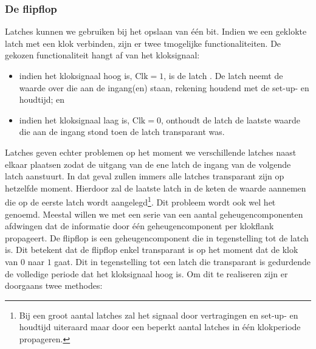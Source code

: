 \subsubsection{De flipflop}
Latches kunnen we gebruiken bij het opslaan van \'e\'en bit. Indien we een geklokte latch met een klok verbinden, zijn er twee tmogelijke functionaliteiten. De gekozen functionaliteit hangt af van het kloksignaal:

\begin{itemize}
 \item indien het kloksignaal hoog is, $\mbox{Clk}=1$, is de latch . De latch neemt de waarde over die aan de ingang(en) staan, rekening houdend met de set-up- en houdtijd; en
 \item indien het kloksignaal laag is, $\mbox{Clk}=0$, onthoudt de latch de laatste waarde die aan de ingang stond toen de latch transparant was.
\end{itemize}

Latches geven echter problemen op het moment we verschillende latches naast elkaar plaatsen zodat de uitgang van de ene latch de ingang van de volgende latch aanstuurt. In dat geval zullen immers alle latches transparant zijn op hetzelfde moment. Hierdoor zal de laatste latch in de keten de waarde aannemen die op de eerste latch wordt aangelegd\footnote{Bij een groot aantal latches zal het signaal door vertragingen en set-up- en houdtijd uiteraard maar door een beperkt aantal latches in \'e\'en klokperiode propageren.}. Dit probleem wordt ook wel het  genoemd. Meestal willen we met een serie van een aantal geheugencomponenten afdwingen dat de informatie door \'e\'en geheugencomponent per klokflank propageert. De flipflop is een geheugencomponent die in tegenstelling tot de latch  is. Dit betekent dat de flipflop enkel transparant is op het moment dat de klok van $0$ naar $1$ gaat. Dit in tegenstelling tot een latch die transparant is gedurdende de volledige periode dat het kloksignaal hoog is. Om dit te realiseren zijn er doorgaans twee methodes:

